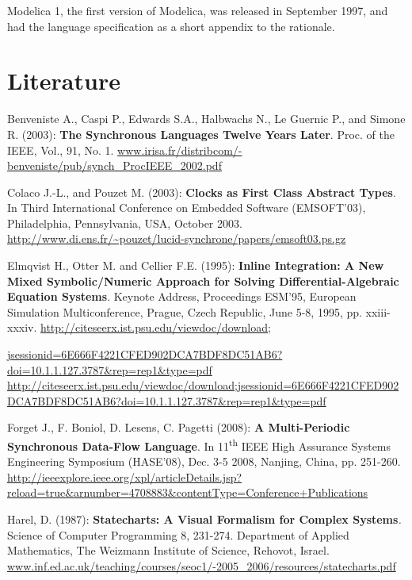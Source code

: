 \documentclass[10pt,a4paper]{report}
\def\doublelabel#1{\label{#1}}
\begin{document}
Modelica 1, the first version of Modelica, was released in September
1997, and had the language specification as a short appendix to the
rationale.

\chapter{Literature}\doublelabel{literature}

Benveniste A., Caspi P., Edwards S.A., Halbwachs N., Le Guernic P., and
Simone R. (2003): \textbf{The Synchronous Languages Twelve Years Later}.
Proc. of the IEEE, Vol., 91, No. 1.
\href{http://www.irisa.fr/distribcom/benveniste/pub/synch_ProcIEEE_2002.pdf}{www.irisa.fr/distribcom/-benveniste/pub/synch\_ProcIEEE\_2002.pdf}

Colaco J.-L., and Pouzet M. (2003): \textbf{Clocks as First Class
Abstract Types}. In Third International Conference on Embedded Software
(EMSOFT'03), Philadelphia, Pennsylvania, USA, October 2003.\\
\url{http://www.di.ens.fr/~pouzet/lucid-synchrone/papers/emsoft03.ps.gz}

Elmqvist H., Otter M. and Cellier F.E. (1995): \textbf{Inline
Integration: A New Mixed Symbolic/Numeric Approach for Solving
Differential-Algebraic Equation Systems}. Keynote Address, Proceedings
ESM'95, European Simulation Multiconference, Prague, Czech Republic,
June 5-8, 1995, pp. xxiii-xxxiv.
\ifpdf
\href{http://citeseerx.ist.psu.edu/viewdoc/download;jsessionid=6E666F4221CFED902DCA7BDF8DC51AB6?doi=10.1.1.127.3787\&rep=rep1\&type=pdf}
{http://citeseerx.ist.psu.edu/viewdoc/download;}

\href{http://citeseerx.ist.psu.edu/viewdoc/download;jsessionid=6E666F4221CFED902DCA7BDF8DC51AB6?doi=10.1.1.127.3787\&rep=rep1\&type=pdf}
{jsessionid=6E666F4221CFED902DCA7BDF8DC51AB6?doi=10.1.1.127.3787\&rep=rep1\&type=pdf}
\else
\url{http://citeseerx.ist.psu.edu/viewdoc/download;jsessionid=6E666F4221CFED902DCA7BDF8DC51AB6?doi=10.1.1.127.3787\&rep=rep1\&type=pdf}
\fi

Forget J., F. Boniol, D. Lesens, C. Pagetti (2008): \textbf{A
Multi-Periodic Synchronous Data-Flow Language}. In
11\textsuperscript{th} IEEE High Assurance Systems Engineering Symposium
(HASE'08), Dec. 3-5 2008, Nanjing, China, pp. 251-260.
\url{http://ieeexplore.ieee.org/xpl/articleDetails.jsp?reload=true\&arnumber=4708883\&contentType=Conference+Publications}

Harel, D. (1987): \textbf{Statecharts: A Visual Formalism for Complex
Systems}\emph{.} Science of Computer Programming 8, 231-274. Department
of Applied Mathematics, The Weizmann Institute of Science, Rehovot,
Israel.
\href{http://www.inf.ed.ac.uk/teaching/courses/seoc1/2005_2006/resources/statecharts.pdf}{www.inf.ed.ac.uk/teaching/courses/seoc1/-2005\_2006/resources/statecharts.pdf}
\end{document}
